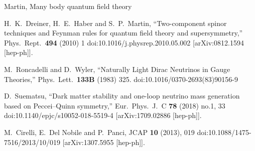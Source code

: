 \begin{thebibliography}{99}
Martin, Many body quantum field theory

  H.~K.~Dreiner, H.~E.~Haber and S.~P.~Martin,
  ``Two-component spinor techniques and Feynman rules for quantum field theory and supersymmetry,''
  Phys.\ Rept.\  {\bf 494} (2010) 1
  doi:10.1016/j.physrep.2010.05.002
  [arXiv:0812.1594 [hep-ph]].

  M.~Roncadelli and D.~Wyler,
  ``Naturally Light Dirac Neutrinos in Gauge Theories,''
  Phys.\ Lett.\  {\bf 133B} (1983) 325.
  doi:10.1016/0370-2693(83)90156-9
  
  D.~Suematsu,
  ``Dark matter stability and one-loop neutrino mass generation based on Peccei–Quinn symmetry,''
  Eur.\ Phys.\ J.\ C {\bf 78} (2018) no.1,  33
  doi:10.1140/epjc/s10052-018-5519-4
  [arXiv:1709.02886 [hep-ph]].


M.~Cirelli, E.~Del Nobile and P.~Panci,
JCAP \textbf{10} (2013), 019
doi:10.1088/1475-7516/2013/10/019
[arXiv:1307.5955 [hep-ph]].
  
\end{thebibliography}
